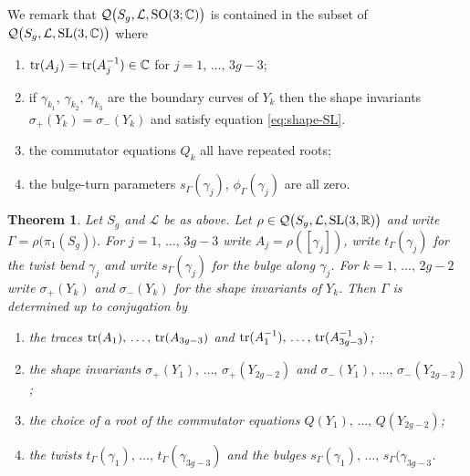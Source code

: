 \documentclass[11pt]{amsart}
\newtheorem{theorem}{Theorem}[section]
\numberwithin{equation}{section}
\begin{document}
We remark that ${\mathcal Q}\bigl(S_g,{\mathcal L},{\rm SO}(3;{\mathbb C})\bigr)$ is contained in the subset of
${\mathcal Q}\bigl(S_g,{\mathcal L},{\rm SL}(3,{\mathbb C})\bigr)$ where
\begin{enumerate}
\item[(1)] ${\rm tr}(A_j)={\rm tr}(A_j^{-1})\in{\mathbb C}$ for $j=1,\,\ldots,\,3g-3$;
\item[(2)] if $\gamma_{k_1},\,\gamma_{k_2},\,\gamma_{k_3}$ are the boundary curves of $Y_k$ then the
shape invariants $\sigma_+(Y_k)=\sigma_-(Y_k)$ and satisfy equation \eqref{eq:shape-SL}.
\item[(3)] the commutator equations $Q_k$ all have repeated roots;
\item[(4)] the bulge-turn parameters $s_\Gamma(\gamma_j)$, $\phi_\Gamma(\gamma_j)$ are all zero.
\end{enumerate}

\begin{theorem}\label{thm:main-SL(3,R)}
Let $S_g$ and ${\mathcal L}$ be as above. Let $\rho\in{\mathcal Q}\bigl(S_g,{\mathcal L}, {\rm SL}(3,{\mathbb R})\bigr)$ and write 
$\Gamma=\rho\bigl(\pi_1(S_g)\bigr)$.
For $j=1,\,\ldots,\,3g-3$ write $A_j=\rho([\gamma_j])$, write $t_\Gamma(\gamma_j)$ 
for the twist bend $\gamma_j$ and write $s_\Gamma(\gamma_j)$ 
for the bulge along $\gamma_j$. For $k=1,\,\ldots,\,2g-2$ write 
$\sigma_+(Y_k)$ and $\sigma_-(Y_k)$ for the shape invariants of $Y_k$. 
Then $\Gamma$ is determined up to conjugation by
\begin{enumerate}
\item[(1)] the traces ${\rm tr}(A_1),\,\ldots,\,{\rm tr}(A_{3g-3})$ and ${\rm tr}(A_1^{-1}),\,\ldots,\,{\rm tr}(A_{3g-3}^{-1})$;
\item[(2)] the shape invariants $\sigma_+(Y_1),\,\ldots,\, \sigma_+(Y_{2g-2})$ and 
$\sigma_-(Y_1),\,\ldots,\, \sigma_-(Y_{2g-2})$; 
\item[(3)] the choice of a root of the commutator equations $Q(Y_1),\,\ldots,\,Q(Y_{2g-2})$; 
\item[(4)] the twists $t_\Gamma(\gamma_1),\,\ldots,\,t_\Gamma(\gamma_{3g-3})$
and the bulges $s_\Gamma(\gamma_1),\,\ldots,\,s_\Gamma(\gamma_{3g-3}$.
\end{enumerate}
\end{theorem}
\end{document}
